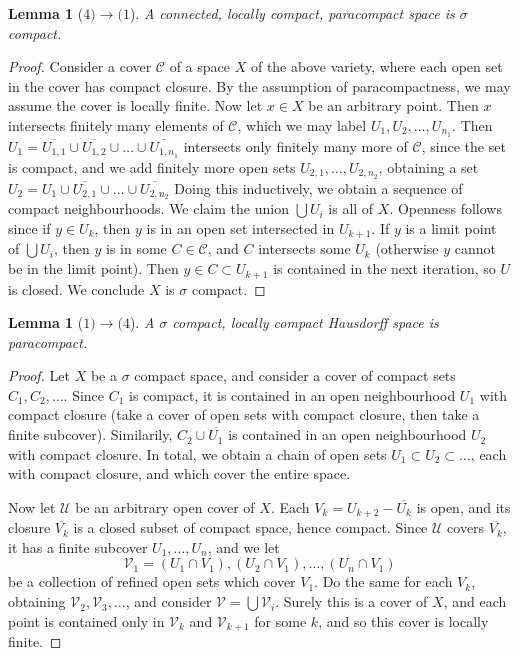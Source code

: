 \documentclass[12pt]{report}
\theoremstyle{plain}
\newtheorem{lemma}[theorem]{Lemma}
\theoremstyle{definition}
\begin{document}
\begin{lemma}[$4) \to (1$]
    A connected, locally compact, paracompact space is $\sigma$ compact.
\end{lemma}
\begin{proof}
    Consider a cover $\mathcal{C}$ of a space $X$ of the above variety, where each open set in the cover has compact closure. By the assumption of paracompactness, we may assume the cover is locally finite. Now let $x \in X$ be an arbitrary point. Then $x$ intersects finitely many elements of $\mathcal{C}$, which we may label $U_1, U_2, \dots, U_{n_1}$. Then $U_1 = \overline{U_{1,1}} \cup \overline{U_{1,2}} \cup \dots \cup \overline{U_{{1,n_1}}}$ intersects only finitely many more of $\mathcal{C}$, since the set is compact, and we add finitely more open sets $U_{2,1}, \dots, U_{2,n_2}$, obtaining a set $U_2 = U_1 \cup \overline{U_{2,1}} \cup \dots \cup \overline{U_{2,n_2}}$ Doing this inductively, we obtain a sequence of compact neighbourhoods. We claim the union $\bigcup U_i$ is all of $X$. Openness follows since if $y \in U_k$, then $y$ is in an open set intersected in $U_{k+1}$. If $y$ is a limit point of $\bigcup U_i$, then $y$ is in some $C \in \mathcal{C}$, and $C$ intersects some $U_k$ (otherwise $y$ cannot be in the limit point). Then $y \in C \subset U_{k+1}$ is contained in the next iteration, so $U$ is closed. We conclude $X$ is $\sigma$ compact.
\end{proof}

\begin{lemma}[$1) \to (4$]
    A $\sigma$ compact, locally compact Hausdorff space is paracompact.
\end{lemma}
\begin{proof}
    Let $X$ be a $\sigma$ compact space, and consider a cover of compact sets $C_1, C_2, \dots$. Since $C_1$ is compact, it is contained in an open neighbourhood $U_1$ with compact closure (take a cover of open sets with compact closure, then take a finite subcover). Similarily, $C_2 \cup \overline{U_1}$ is contained in an open neighbourhood $U_2$ with compact closure. In total, we obtain a chain of open sets $U_1 \subset U_2 \subset \dots$, each with compact closure, and which cover the entire space.

    Now let $\mathcal{U}$ be an arbitrary open cover of $X$. Each $V_k = U_{k+2} - \overline{U_k}$ is open, and its closure $\overline{V_k}$ is a closed subset of compact space, hence compact. Since $\mathcal{U}$ covers $\overline{V_k}$, it has a finite subcover $U_1, \dots, U_n$, and we let
    \[ \mathcal{V}_1 = (U_1 \cap V_1), (U_2 \cap V_1), \dots, (U_n \cap V_1) \]
    be a collection of refined open sets which cover $V_1$. Do the same for each $V_k$, obtaining $\mathcal{V}_2, \mathcal{V}_3, \dots$, and consider $\mathcal{V} = \bigcup \mathcal{V}_i$. Surely this is a cover of $X$, and each point is contained only in $\mathcal{V}_k$ and $\mathcal{V}_{k+1}$ for some $k$, and so this cover is locally finite.
\end{proof}
\end{document}
